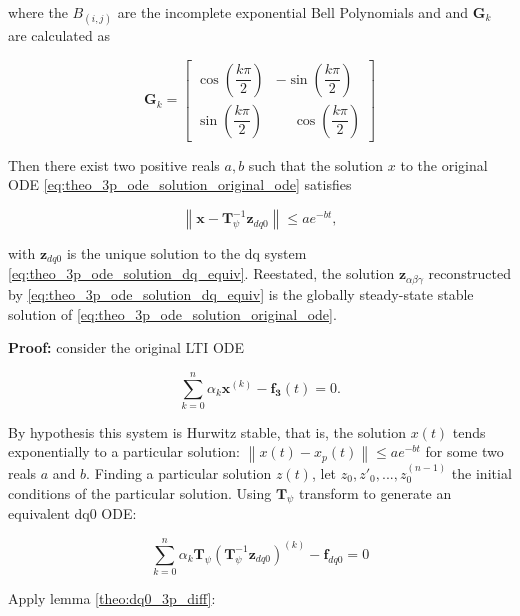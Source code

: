 \begin{theorem}
	\noindent where the $B_{\left(i,j\right)}$ are the incomplete exponential Bell Polynomials and and $\mathbf{G}_k$ are calculated as

\begin{equation}
\mathbf{G}_k = 
\left[\begin{array}{ccc}
 \cos\left(\dfrac{k\pi}{2}\right) &  -\sin\left(\dfrac{k\pi}{2}\right) \\[5mm]
 \sin\left(\dfrac{k\pi}{2}\right) & \phantom{-} \cos\left(\dfrac{k\pi}{2}\right)
\end{array}\right]
\end{equation}

	Then there exist two positive reals $a,b$ such that the solution $x$ to the original ODE \eqref{eq:theo_3p_ode_solution_original_ode} satisfies

\begin{equation} \left\lVert \mathbf{x} - \mathbf{T}^{-1}_\psi\mathbf{z}_{dq0}\right\rVert \leq ae^{-bt}, \label{eq:theo_3p_ode_solution_exp}\end{equation}

	\noindent with $\mathbf{z}_{dq0}$ is the unique solution to the dq system \eqref{eq:theo_3p_ode_solution_dq_equiv}. Reestated, the solution $\mathbf{z}_{\alpha\beta\gamma}$ reconstructed by \eqref{eq:theo_3p_ode_solution_dq_equiv} is the globally steady-state stable solution of \eqref{eq:theo_3p_ode_solution_original_ode}.

\end{theorem}
\textbf{Proof:} consider the original LTI ODE

\begin{equation} \sum\limits_{k=0}^n \alpha_k \mathbf{x}^{\left(k\right)} - \mathbf{f_3}(t) = 0.\end{equation}

	By hypothesis this system is Hurwitz stable, that is, the solution $x(t)$ tends exponentially to a particular solution: $\left\lVert x(t) - x_p(t)\right\rVert \leq ae^{-bt}$ for some two reals $a$ and $b$. Finding a particular solution $z(t)$, let $z_0,z'_0,...,z^{(n-1)}_0$ the initial conditions of the particular solution. Using $\mathbf{T}_\psi$ transform to generate an equivalent dq0 ODE:

\begin{equation} \sum\limits_{k=0}^n \alpha_k \mathbf{T}_\psi\left(\mathbf{T}_\psi^{-1}\mathbf{z}_{dq0}\right)^{\left(k\right)} - \mathbf{f}_{dq0} = 0 \end{equation}

	Apply lemma \ref{theo:dq0_3p_diff}:

